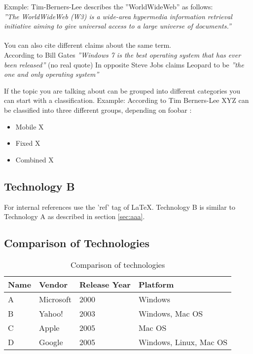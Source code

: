 Exmple: Tim-Berners-Lee describes the ''WorldWideWeb'' as follows:
\\
\textit{''The WorldWideWeb (W3) is a wide-area hypermedia information retrieval initiative aiming to give universal access to a large universe of documents.''} \cite{timwww}
\\
\\
You can also cite different claims about the same term.
\\
According to Bill Gates \textit{''Windows 7 is the best operating system that has ever been released''} \cite{billgates} (no real quote)
In opposite Steve Jobs claims Leopard to be \textit{''the one and only operating system''} \cite{stevejobs}

If the topic you are talking about can be grouped into different categories you can start with a classification.
Example: According to Tim Berners-Lee XYZ can be classified into three different groups, depending on foobar \cite{timwww}:
	\begin{itemize}
		\item Mobile X
				\vspace{-0.1in} 
		\item Fixed X
				\vspace{-0.1in} 
		\item Combined X
 	\end{itemize}

\subsection{Technology B\label{sec:bbb}}

For internal references use the 'ref' tag of LaTeX. Technology B is similar to Technology A as described in section \ref{sec:aaa}.

\newpage

\subsection{Comparison of Technologies\label{sec:comp}}

\begin{table}[htb]
\centering
\begin{tabular}[t]{|l|l|l|l|}
\hline
Name & Vendor & Release Year & Platform \\
\hline
\hline
A & Microsoft & 2000 & Windows \\
\hline
B & Yahoo! & 2003 & Windows, Mac OS \\
\hline
C & Apple & 2005 & Mac OS \\
\hline
D & Google & 2005 & Windows, Linux, Mac OS \\
\hline
\end{tabular}
\caption{Comparison of technologies}
\label{tab:enghistory}
\end{table}

